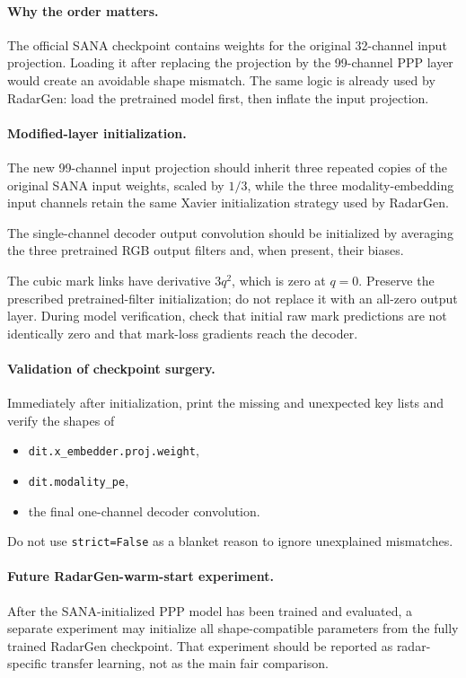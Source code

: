 \documentclass[11pt,a4paper]{article}
\begin{document}
\paragraph{Why the order matters.}
The official SANA checkpoint contains weights for the original 32-channel input projection. Loading it after replacing the projection by the 99-channel PPP layer would create an avoidable shape mismatch. The same logic is already used by RadarGen: load the pretrained model first, then inflate the input projection.

\paragraph{Modified-layer initialization.}
The new 99-channel input projection should inherit three repeated copies of the original SANA input weights, scaled by \(1/3\), while the three modality-embedding input channels retain the same Xavier initialization strategy used by RadarGen.

The single-channel decoder output convolution should be initialized by averaging the three pretrained RGB output filters and, when present, their biases.

The cubic mark links have derivative \(3q^2\), which is zero at
\(q=0\). Preserve the prescribed pretrained-filter initialization;
do not replace it with an all-zero output layer.
During model verification, check that initial raw mark predictions
are not identically zero and that mark-loss gradients reach the decoder.

\paragraph{Validation of checkpoint surgery.}
Immediately after initialization, print the missing and unexpected key lists and verify the shapes of
\begin{itemize}
    \item \texttt{dit.x\_embedder.proj.weight},
    \item \texttt{dit.modality\_pe},
    \item the final one-channel decoder convolution.
\end{itemize}

Do not use \texttt{strict=False} as a blanket reason to ignore unexplained mismatches.

\paragraph{Future RadarGen-warm-start experiment.}
After the SANA-initialized PPP model has been trained and evaluated, a separate experiment may initialize all shape-compatible parameters from the fully trained RadarGen checkpoint. That experiment should be reported as radar-specific transfer learning, not as the main fair comparison.
\end{document}
